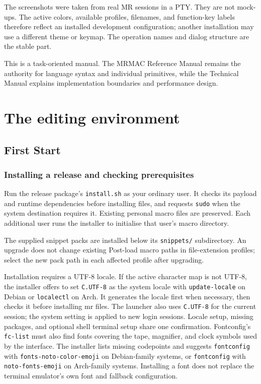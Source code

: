\documentclass[a4paper,10pt,twoside,openany]{book}
\makeatletter
\newcommand{\mr}{\textsc{MR}}
\newcommand{\mrmac}{\textsc{MRMAC}}
\newcommand{\field}[1]{\textsf{#1}\index{dialog fields!#1@\textsf{#1}}}
\makeatother
\begin{document}
The screenshots were taken from real \mr{} sessions in a PTY. They are not
mock-ups. The active colors, available profiles, filenames, and function-key
labels therefore reflect an installed development configuration; another
installation may use a different theme or keymap. The operation names and
dialog structure are the stable part.

This is a task-oriented manual. The \mrmac{} Reference Manual remains the
authority for language syntax and individual primitives, while the Technical
Manual explains implementation boundaries and performance design.

\tableofcontents

\mainmatter

\part{The editing environment}

\chapter{First Start}

\section{Installing a release and checking prerequisites}

Run the release package's \texttt{install.sh} as your ordinary user. It checks
its payload and runtime dependencies before installing files, and requests
\texttt{sudo} when the system destination requires it. Existing personal macro
files are preserved. Each additional user runs the installer to initialise
that user's macro directory.

The supplied snippet packs are installed below its
\texttt{snippets/} subdirectory. An upgrade does not change existing
\field{Post-load macro} paths in file-extension profiles; select the new
pack path in each affected profile after upgrading.

Installation requires a UTF-8 locale. If the active character map is not
UTF-8, the installer offers to set \texttt{C.UTF-8} as the system locale with
\texttt{update-locale} on Debian or \texttt{localectl} on Arch. It generates the
locale first when necessary, then checks it before installing mr files. The
launcher also uses \texttt{C.UTF-8} for the current session; the system setting
is applied to new login sessions. Locale setup, missing packages, and optional
shell terminal setup share one confirmation. Fontconfig's \texttt{fc-list}
must also find fonts covering the tape, magnifier, and clock symbols used by
the interface. The installer lists missing codepoints and suggests
\texttt{fontconfig} with \texttt{fonts-noto-color-emoji} on Debian-family
systems, or \texttt{fontconfig} with \texttt{noto-fonts-emoji} on Arch-family
systems. Installing a font does not replace the terminal emulator's own font
and fallback configuration.
\end{document}
